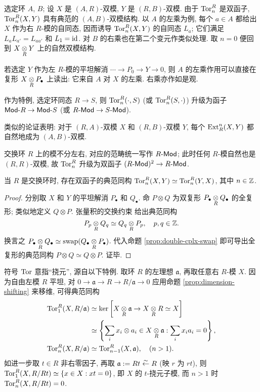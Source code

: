 \begin{remark}[双模结构]\label{rem:ExtTor-bimodule}
	选定环 $A$, $B$; 设 $X$ 是 $(A, R)$-双模, $Y$ 是 $(R, B)$-双模. 由于 $\operatorname{Tor}^R_n$ 是双函子, $\operatorname{Tor}^R_n(X, Y)$ 具有典范的 $(A, B)$-双模结构. 以 $A$ 的左乘为例, 每个 $a \in A$ 都给出 $X$ 作为右 $R$-模的自同态, 因而诱导 $\operatorname{Tor}^R_n(X, Y)$ 的自同态 $L_a$; 它们满足 $L_a L_{a'} = L_{aa'}$ 和 $L_1 = \mathrm{id}$. 对 $B$ 的右乘也在第二个变元作类似处理. 取 $n=0$ 便回到 $X \underset{R}{\otimes} Y$ 上的自然双模结构.
	
	若选定 $Y$ 作为左 $R$-模的平坦解消 $\cdots \to P_0 \to Y \to 0$, 则 $A$ 的左乘作用可以直接在复形 $X \underset{R}{\otimes} P_\bullet$ 上读出: 它来自 $A$ 对 $X$ 的左乘. 右乘亦作如是观.

	作为特例, 选定环同态 $R \to S$, 则 $\operatorname{Tor}^R_n(\cdot, S)$ (或 $\operatorname{Tor}^R_n(S, \cdot)$) 升级为函子 $\mathsf{Mod}\text{-}R \to \mathsf{Mod}\text{-}S$ (或 $R\text{-}\mathsf{Mod} \to S\text{-}\mathsf{Mod}$).

	类似的论证表明: 对于 $(R, A)$-双模 $X$ 和 $(R, B)$-双模 $Y$, 每个 $\operatorname{Ext}^n_R(X, Y)$ 都自然地成为 $(A, B)$-双模.
\end{remark}

交换环 $R$ 上的模不分左右, 对应的范畴统一写作 $R\text{-}\mathsf{Mod}$; 此时任何 $R$-模自然也是 $(R, R)$-双模, 故 $\operatorname{Tor}^R_n$ 升级为双函子 $(R\text{-}\mathsf{Mod})^2 \to R\text{-}\mathsf{Mod}$.

\begin{proposition}\label{prop:Tor-symmetry}
	当 $R$ 是交换环时, 存在双函子的典范同构 $\operatorname{Tor}_n^R(X, Y) \simeq \operatorname{Tor}_n^R(Y, X)$, 其中 $n \in \mathbb{Z}$.
\end{proposition}
\begin{proof}
	分别取 $X$ 和 $Y$ 的平坦解消 $P_\bullet$ 和 $Q_\bullet$. 命 $P \otimes Q$ 为双复形 $P_\bullet \underset{R}{\otimes} Q_\bullet$ 的全复形; 类似地定义 $Q \otimes P$. 张量积的交换约束 \cite[命题 6.5.14]{Li1} 给出典范同构
	\[ P_p \underset{R}{\otimes} Q_q \simeq Q_q \underset{R}{\otimes} P_p, \quad p, q \in \mathbb{Z}. \]
	换言之 $P_\bullet \underset{R}{\otimes} Q_\bullet \simeq \mathrm{swap}(Q_\bullet \underset{R}{\otimes} P_\bullet)$. 代入命题 \ref{prop:double-cplx-swap} 即可导出全复形的典范同构 $P \otimes Q \simeq Q \otimes P$. 证毕.
\end{proof}

\begin{remark}
	符号 $\operatorname{Tor}$ 意指``挠元'', 源自以下特例. 取环 $R$ 的左理想 $\mathfrak{a}$, 再取任意右 $R$-模 $X$. 因为自由左模 $R$ 平坦, 对 $0 \to \mathfrak{a} \to R \to R/\mathfrak{a} \to 0$ 应用命题 \ref{prop:dimension-shifting} 来移维, 可得典范同构
	\begin{align*}
		\operatorname{Tor}^R_1(X, R/\mathfrak{a}) & \simeq \operatorname{ker}\left[ X \underset{R}{\otimes} \mathfrak{a} \to X \underset{R}{\otimes} R \simeq X \right] \\
		& \simeq \left\{ \sum_i x_i \otimes a_i \in X \underset{R}{\otimes} \mathfrak{a} : \sum_i x_i a_i = 0 \right\}, \\
		\operatorname{Tor}^R_n(X, R/\mathfrak{a}) & \simeq \operatorname{Tor}^R_{n-1}(X, \mathfrak{a}), \quad (n > 1).
	\end{align*}
	如进一步取 $t \in R$ 非右零因子, 再取 $\mathfrak{a} := Rt \stackrel{\sim}{\leftarrow} R$ (映 $r$ 为 $rt$), 则 $\operatorname{Tor}^R_1(X, R/Rt) \simeq \left\{ x \in X: xt = 0 \right\}$, 即 $X$ 的 $t$-挠元子模, 而 $n > 1$ 时 $\operatorname{Tor}^R_n(X, R/Rt) = 0$.
\end{remark}

